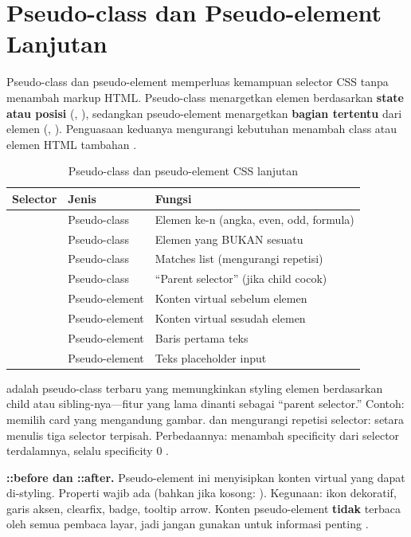 ﻿\section{Pseudo-class dan Pseudo-element Lanjutan}

Pseudo-class dan pseudo-element memperluas kemampuan selector CSS tanpa menambah markup HTML. Pseudo-class menargetkan elemen berdasarkan \textbf{state atau posisi} (, ), sedangkan pseudo-element menargetkan \textbf{bagian tertentu} dari elemen (, ). Penguasaan keduanya mengurangi kebutuhan menambah class atau elemen HTML tambahan \cite{mdnCss}.

\begin{table}[H]
\centering
\begin{tabular}{|P{3cm}|P{3cm}|P{6cm}|}
\hline
\textbf{Selector} & \textbf{Jenis} & \textbf{Fungsi} \\
\hline
{} & Pseudo-class & Elemen ke-n (angka, even, odd, formula) \\
\hline
{} & Pseudo-class & Elemen yang BUKAN sesuatu \\
\hline
{} & Pseudo-class & Matches list (mengurangi repetisi) \\
\hline
{} & Pseudo-class & ``Parent selector'' (jika child cocok) \\
\hline
{} & Pseudo-element & Konten virtual sebelum elemen \\
\hline
{} & Pseudo-element & Konten virtual sesudah elemen \\
\hline
{} & Pseudo-element & Baris pertama teks \\
\hline
{} & Pseudo-element & Teks placeholder input \\
\hline
\end{tabular}
\caption{Pseudo-class dan pseudo-element CSS lanjutan}
\end{table}

 adalah pseudo-class terbaru yang memungkinkan styling elemen berdasarkan child atau sibling-nya---fitur yang lama dinanti sebagai ``parent selector.'' Contoh:  memilih card yang mengandung gambar.  dan  mengurangi repetisi selector:  setara menulis tiga selector terpisah. Perbedaannya:  menambah specificity dari selector terdalamnya,  selalu specificity 0 \cite{webdevCss}.

\begin{konsep}
\textbf{::before dan ::after.} Pseudo-element ini menyisipkan konten virtual yang dapat di-styling. Properti  wajib ada (bahkan jika kosong: ). Kegunaan: ikon dekoratif, garis aksen, clearfix, badge, tooltip arrow. Konten pseudo-element \textbf{tidak} terbaca oleh semua pembaca layar, jadi jangan gunakan untuk informasi penting \cite{mdnAccessibility}.
\end{konsep}

